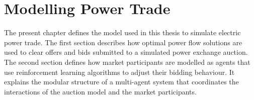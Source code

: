 \chapter{Modelling Power Trade}
\label{ch:method}
The present chapter defines the model used in this thesis to simulate electric
power trade. The first section describes how optimal power flow solutions are
used to clear offers and bids submitted to a simulated power exchange auction.
The second section defines how market participants are modelled as agents that
use reinforcement learning algorithms to adjust their bidding behaviour. It
explains the modular structure of a multi-agent system that coordinates the
interactions of the auction model and the market participants.

%
%
